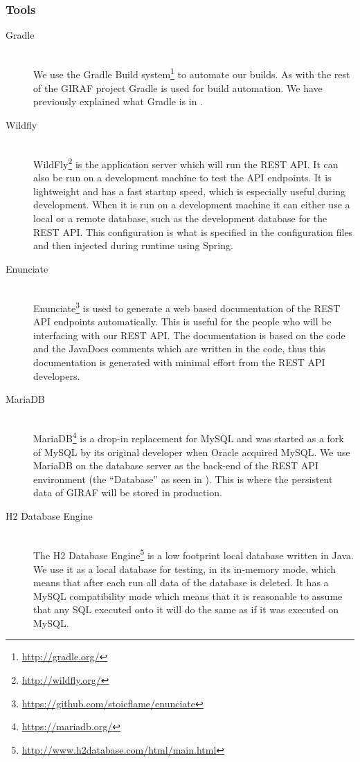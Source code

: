 \subsubsection{Tools}
\begin{description}
    \item[Gradle] \hfill \\
        We use the Gradle Build system\footnote{\url{http://gradle.org/}} to automate our builds.
        As with the rest of the GIRAF project Gradle is used for build automation.
        We have previously explained what Gradle is in .

    \item[Wildfly] \hfill \\
        WildFly\footnote{\url{http://wildfly.org/}} is the application server which will run the REST API.
        It can also be run on a development machine to test the API endpoints.
        It is lightweight and has a fast startup speed, which is especially useful during development.
        When it is run on a development machine it can either use a local or a remote database, such as the development database for the REST API.
        This configuration is what is specified in the configuration files and then injected during runtime using Spring.

    \item[Enunciate] \hfill \\
        Enunciate\footnote{\url{https://github.com/stoicflame/enunciate}} is used to generate a web based documentation of the REST API endpoints automatically.
        This is useful for the people who will be interfacing with our REST API.
        The documentation is based on the code and the JavaDocs comments which are written in the code, thus this documentation is generated with minimal effort from the REST API developers.

    \item[MariaDB] \hfill \\
        MariaDB\footnote{\url{https://mariadb.org/}} is a drop-in replacement for MySQL and was started as a fork of MySQL by its original developer when Oracle acquired MySQL.
        We use MariaDB on the database server as the back-end of the REST API environment (the \enquote{Database} as seen in ).
        This is where the persistent data of GIRAF will be stored in production.

    \item[H2 Database Engine] \hfill \\
        The H2 Database Engine\footnote{\url{http://www.h2database.com/html/main.html}} is a low footprint local database written in Java.
        We use it as a local database for testing, in its in-memory mode, which means that after each run all data of the database is deleted.
        It has a MySQL compatibility mode which means that it is reasonable to assume that any SQL executed onto it will do the same as if it was executed on MySQL.


\end{description}
